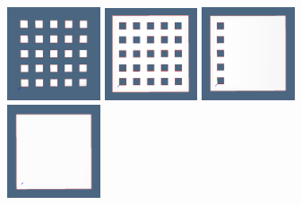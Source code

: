 \documentclass[11pt,oneside]{article}    %
\begin{document}
\begin{figure}[htbp] %
   \centering
   \includegraphics[height=0.245\textwidth,width=0.245\textwidth]{images/reconfig1} 
   \includegraphics[height=0.245\textwidth,width=0.245\textwidth]{images/reconfig3} 
   \includegraphics[height=0.245\textwidth,width=0.245\textwidth]{images/reconfig5} 
   \includegraphics[height=0.245\textwidth,width=0.245\textwidth]{images/reconfig7}
   

\end{figure}
\end{document}
